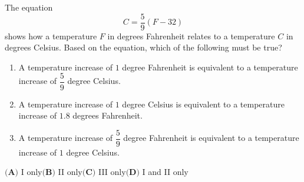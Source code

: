 The equation
\[C=\dfrac{5}{9}(F-32)\]
shows how a temperature $F$ in degrees Fahrenheit relates to a temperature $C$ in degrees Celsius. Based on the equation, which of the following must be true?
\begin{enumerate}
\item[I.] A temperature increase of $1$ degree Fahrenheit is equivalent to a temperature increase of $\dfrac{5}{9}$ degree Celsius.
\item[II.] A temperature increase of $1$ degree Celsius is equivalent to a temperature increase of $1.8$ degrees Fahrenheit.
\item[III.] A temperature increase of $\dfrac{5}{9}$ degree Fahrenheit is equivalent to a temperature increase of $1$ degree Celsius.
\end{enumerate}
$\textbf{(A)}$ I only\qquad $\textbf{(B)}$ II only\qquad $\textbf{(C)}$ III only\qquad $\textbf{(D)}$ I and II only
